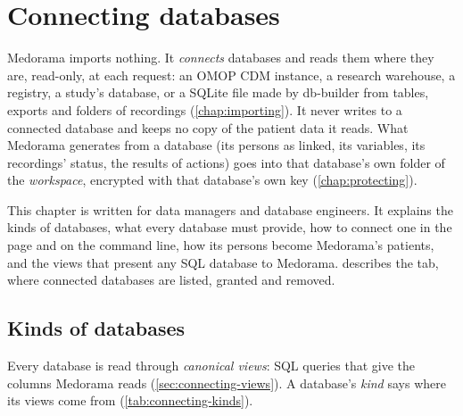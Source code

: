 \chapter{Connecting databases}
\label{chap:connecting}

Medorama imports nothing. It \emph{connects} databases and reads them where they are,
read-only, at each request: an OMOP CDM instance, a research warehouse, a registry, a study's
database, or a SQLite file made by db-builder from tables, exports and folders of recordings
(\cref{chap:importing}). It never writes to a connected database and keeps no copy of the
patient data it reads. What Medorama generates from a database (its persons as linked, its
variables, its recordings' status, the results of actions) goes into that database's own folder
of the \emph{workspace}, encrypted with that database's own key (\cref{chap:protecting}).

This chapter is written for data managers and database engineers. It explains the kinds of
databases, what every database must provide, how to connect one in the page and on the command
line, how its persons become Medorama's patients, and the views that present any SQL database to
Medorama.  describes the  tab, where connected databases
are listed, granted and removed.

\section{Kinds of databases}
\label{sec:connecting-kinds}
\label{sec:connecting-ways}

Every database is read through \emph{canonical views}: SQL queries that give the columns Medorama
reads (\cref{sec:connecting-views}). A database's \emph{kind} says where its views come from
(\cref{tab:connecting-kinds}).

